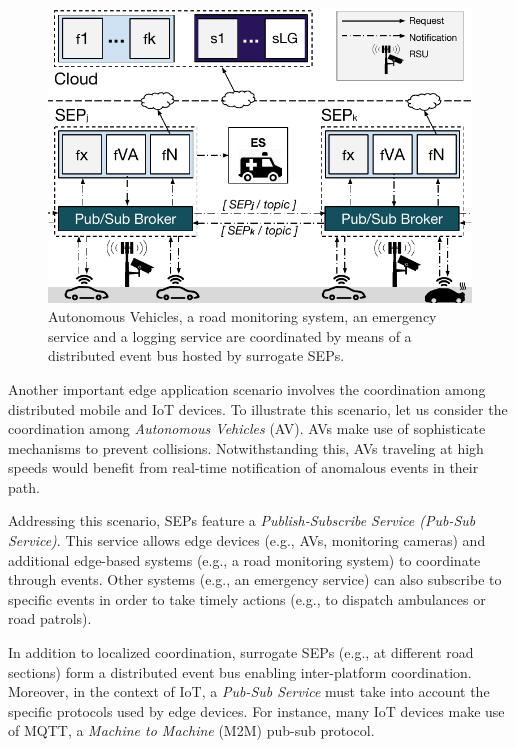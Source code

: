 \begin{figure}[bp]
	\centering
	\includegraphics[width=1\linewidth]{Figs/Edge_Coordination_AVs_wide.pdf}
	\caption{Autonomous Vehicles, a road monitoring system, an emergency service and a logging service are coordinated by means of a distributed event bus hosted by surrogate SEPs.}
	\label{fig:Edge_Coordination_AVs}
\end{figure}

Another important edge application scenario involves the coordination among distributed mobile and IoT devices. %
To illustrate this scenario, let us consider the coordination among \textit{Autonomous Vehicles} (AV). %
AVs make use of sophisticate mechanisms to prevent collisions. Notwithstanding this, AVs traveling at high speeds would benefit from real-time notification of anomalous events in their path. 

Addressing this scenario, SEPs feature a \textit{Publish-Subscribe Service (Pub-Sub Service)}. This service allows edge devices (e.g., AVs, monitoring cameras) and additional edge-based systems (e.g., a road monitoring system) to coordinate through events.
Other systems (e.g., an emergency service) can also subscribe to specific events in order to take timely actions (e.g., to dispatch ambulances or road patrols).

In addition to localized coordination, surrogate SEPs (e.g., at different road sections) form a distributed event bus enabling inter-platform coordination. Moreover, in the context of IoT, a \textit{Pub-Sub Service} must take into account the specific protocols used by edge devices. For instance, many IoT devices make use of MQTT, a \textit{Machine to Machine} (M2M) pub-sub protocol. 

